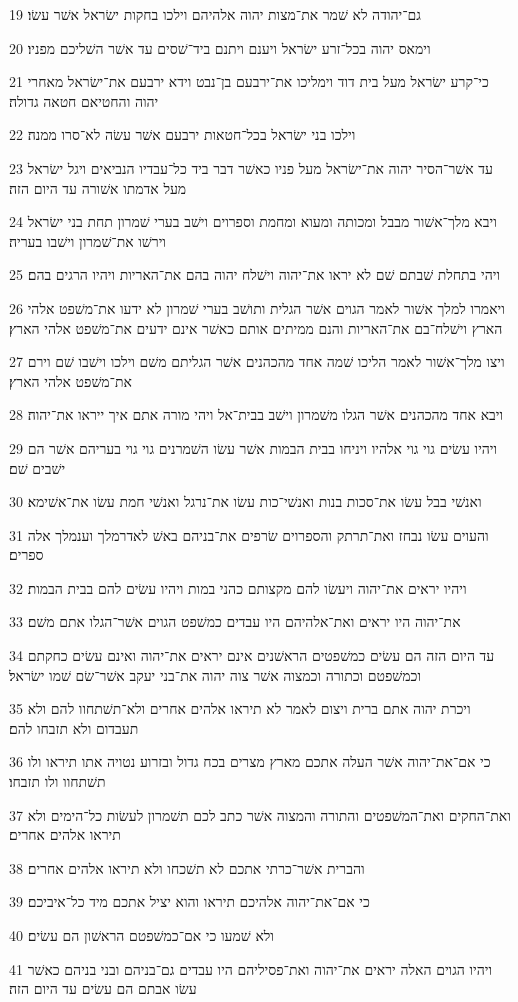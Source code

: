 \par 19 גם־יהודה לא שׁמר את־מצות יהוה אלהיהם וילכו בחקות ישׂראל אשׁר עשׂו׃
\par 20 וימאס יהוה בכל־זרע ישׂראל ויענם ויתנם ביד־שׁסים עד אשׁר השׁליכם מפניו׃
\par 21 כי־קרע ישׂראל מעל בית דוד וימליכו את־ירבעם בן־נבט וידא ירבעם את־ישׂראל מאחרי יהוה והחטיאם חטאה גדולה׃
\par 22 וילכו בני ישׂראל בכל־חטאות ירבעם אשׁר עשׂה לא־סרו ממנה׃
\par 23 עד אשׁר־הסיר יהוה את־ישׂראל מעל פניו כאשׁר דבר ביד כל־עבדיו הנביאים ויגל ישׂראל מעל אדמתו אשׁורה עד היום הזה׃
\par 24 ויבא מלך־אשׁור מבבל ומכותה ומעוא ומחמת וספרוים וישׁב בערי שׁמרון תחת בני ישׂראל וירשׁו את־שׁמרון וישׁבו בעריה׃
\par 25 ויהי בתחלת שׁבתם שׁם לא יראו את־יהוה וישׁלח יהוה בהם את־האריות ויהיו הרגים בהם׃
\par 26 ויאמרו למלך אשׁור לאמר הגוים אשׁר הגלית ותושׁב בערי שׁמרון לא ידעו את־משׁפט אלהי הארץ וישׁלח־בם את־האריות והנם ממיתים אותם כאשׁר אינם ידעים את־משׁפט אלהי הארץ׃
\par 27 ויצו מלך־אשׁור לאמר הליכו שׁמה אחד מהכהנים אשׁר הגליתם משׁם וילכו וישׁבו שׁם וירם את־משׁפט אלהי הארץ׃
\par 28 ויבא אחד מהכהנים אשׁר הגלו משׁמרון וישׁב בבית־אל ויהי מורה אתם איך ייראו את־יהוה׃
\par 29 ויהיו עשׂים גוי גוי אלהיו ויניחו בבית הבמות אשׁר עשׂו השׁמרנים גוי גוי בעריהם אשׁר הם ישׁבים שׁם׃
\par 30 ואנשׁי בבל עשׂו את־סכות בנות ואנשׁי־כות עשׂו את־נרגל ואנשׁי חמת עשׂו את־אשׁימא׃
\par 31 והעוים עשׂו נבחז ואת־תרתק והספרוים שׂרפים את־בניהם באשׁ לאדרמלך וענמלך אלה ספרים׃
\par 32 ויהיו יראים את־יהוה ויעשׂו להם מקצותם כהני במות ויהיו עשׂים להם בבית הבמות׃
\par 33 את־יהוה היו יראים ואת־אלהיהם היו עבדים כמשׁפט הגוים אשׁר־הגלו אתם משׁם׃
\par 34 עד היום הזה הם עשׂים כמשׁפטים הראשׁנים אינם יראים את־יהוה ואינם עשׂים כחקתם וכמשׁפטם וכתורה וכמצוה אשׁר צוה יהוה את־בני יעקב אשׁר־שׂם שׁמו ישׂראל׃
\par 35 ויכרת יהוה אתם ברית ויצום לאמר לא תיראו אלהים אחרים ולא־תשׁתחוו להם ולא תעבדום ולא תזבחו להם׃
\par 36 כי אם־את־יהוה אשׁר העלה אתכם מארץ מצרים בכח גדול ובזרוע נטויה אתו תיראו ולו תשׁתחוו ולו תזבחו׃
\par 37 ואת־החקים ואת־המשׁפטים והתורה והמצוה אשׁר כתב לכם תשׁמרון לעשׂות כל־הימים ולא תיראו אלהים אחרים׃
\par 38 והברית אשׁר־כרתי אתכם לא תשׁכחו ולא תיראו אלהים אחרים׃
\par 39 כי אם־את־יהוה אלהיכם תיראו והוא יציל אתכם מיד כל־איביכם׃
\par 40 ולא שׁמעו כי אם־כמשׁפטם הראשׁון הם עשׂים׃
\par 41 ויהיו הגוים האלה יראים את־יהוה ואת־פסיליהם היו עבדים גם־בניהם ובני בניהם כאשׁר עשׂו אבתם הם עשׂים עד היום הזה׃

